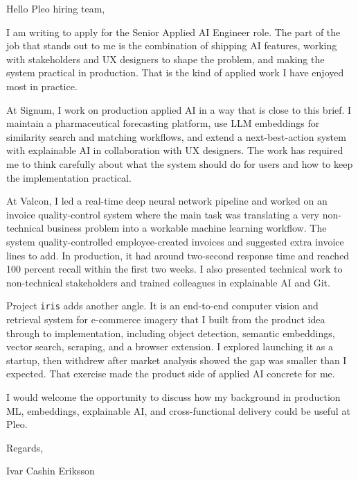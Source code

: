 \documentclass[11pt,a4paper]{moderncv}
\begin{document}
\makecvtitle
Hello Pleo hiring team,

\vspace*{2em}
I am writing to apply for the Senior Applied AI Engineer role. The part of the job that stands out to me is the combination of shipping AI features, working with stakeholders and UX designers to shape the problem, and making the system practical in production. That is the kind of applied work I have enjoyed most in practice.

\hspace*{2em}
At Signum, I work on production applied AI in a way that is close to this brief. I maintain a pharmaceutical forecasting platform, use LLM embeddings for similarity search and matching workflows, and extend a next-best-action system with explainable AI in collaboration with UX designers. The work has required me to think carefully about what the system should do for users and how to keep the implementation practical.

\hspace*{2em}
At Valcon, I led a real-time deep neural network pipeline and worked on an invoice quality-control system where the main task was translating a very non-technical business problem into a workable machine learning workflow. The system quality-controlled employee-created invoices and suggested extra invoice lines to add. In production, it had around two-second response time and reached 100 percent recall within the first two weeks. I also presented technical work to non-technical stakeholders and trained colleagues in explainable AI and Git.

\hspace*{2em}
Project \texttt{iris} adds another angle. It is an end-to-end computer vision and retrieval system for e-commerce imagery that I built from the product idea through to implementation, including object detection, semantic embeddings, vector search, scraping, and a browser extension. I explored launching it as a startup, then withdrew after market analysis showed the gap was smaller than I expected. That exercise made the product side of applied AI concrete for me.

\hspace*{2em}
I would welcome the opportunity to discuss how my background in production ML, embeddings, explainable AI, and cross-functional delivery could be useful at Pleo.

\vspace*{2em}
Regards,

\vspace*{1em}
Ivar Cashin Eriksson
\end{document}
